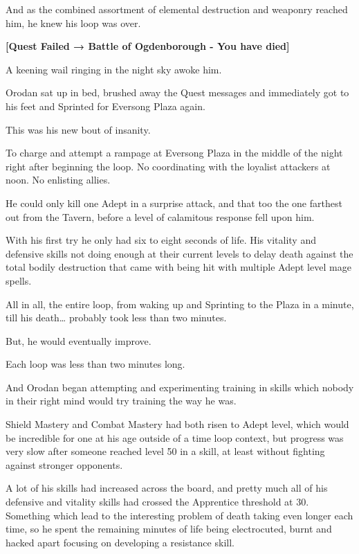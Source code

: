 \documentclass[a4paper,10pt]{book}
\begin{document}
And as the combined assortment of elemental destruction and weaponry reached him, he knew his loop was over.\par
\textbf{[Quest Failed → Battle of Ogdenborough - You have died]}\par
A keening wail ringing in the night sky awoke him.\par
Orodan sat up in bed, brushed away the Quest messages and immediately got to his feet and Sprinted for Eversong Plaza again.\par
This was his new bout of insanity.\par
To charge and attempt a rampage at Eversong Plaza in the middle of the night right after beginning the loop. No coordinating with the loyalist attackers at noon. No enlisting allies.\par
He could only kill one Adept in a surprise attack, and that too the one farthest out from the Tavern, before a level of calamitous response fell upon him.\par
With his first try he only had six to eight seconds of life. His vitality and defensive skills not doing enough at their current levels to delay death against the total bodily destruction that came with being hit with multiple Adept level mage spells.\par
All in all, the entire loop, from waking up and Sprinting to the Plaza in a minute, till his death… probably took less than two minutes.\par
But, he would eventually improve.\par
\par
Each loop was less than two minutes long.\par
And Orodan began attempting and experimenting training in skills which nobody in their right mind would try training the way he was.\par
Shield Mastery and Combat Mastery had both risen to Adept level, which would be incredible for one at his age outside of a time loop context, but progress was very slow after someone reached level 50 in a skill, at least without fighting against stronger opponents.\par
A lot of his skills had increased across the board, and pretty much all of his defensive and vitality skills had crossed the Apprentice threshold at 30. Something which lead to the interesting problem of death taking even longer each time, so he spent the remaining minutes of life being electrocuted, burnt and hacked apart focusing on developing a resistance skill.\par
\end{document}
